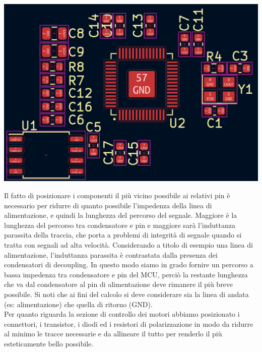 \begin{center}
\includegraphics[scale=0.3]{figures/image29.png}
\captionsetup{type=figure}
\end{center}

\noindent Il fatto di posizionare i componenti il più vicino possibile ai relativi
pin è necessario per ridurre di quanto possibile l'impedenza della linea
di alimentazione, e quindi la lunghezza del percorso del segnale.
Maggiore è la lunghezza del percorso tra condensatore e pin e maggiore
sarà l'induttanza parassita della traccia, che porta a problemi di
integrità di segnale quando si tratta con segnali ad alta velocità.
Considerando a titolo di esempio una linea di alimentazione,
l'induttanza parassita è contrastata dalla presenza dei condensatori di
decoupling. In questo modo siamo in grado fornire un percorso a bassa
impedenza tra condensatore e pin del MCU, perciò la restante lunghezza
che va dal condensatore al pin di alimentazione deve rimanere il più
breve possibile. Si noti che ai fini del calcolo si deve considerare sia
la linea di andata (es: alimentazione) che quella di ritorno (GND).\\
Per quanto riguarda la sezione di controllo dei motori abbiamo
posizionato i connettori, i transistor, i diodi ed i resistori di
polarizzazione in modo da ridurre al minimo le tracce necessarie e da
allineare il tutto per renderlo il più esteticamente bello possibile.

